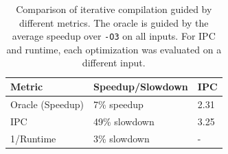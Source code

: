 \begin{table}[t]
\centering
\label{tab:motivation_metrics}
\begin{tabular}{|l|l|l|}
\hline
\textbf{Metric} & \textbf{Speedup/Slowdown} & \textbf{IPC} \\ \hline
\rowcolor{Gray} Oracle (Speedup)             & 7\% speedup                                 & 2.31                      \\ \hline
IPC                          & 49\% slowdown                                & 3.25                      \\ \hline
\rowcolor{Gray}1/Runtime                    & 3\% slowdown                                  & {-}   \\ \hline
\end{tabular}
\caption{Comparison of iterative compilation guided by different metrics.
The oracle is guided by the average speedup over \texttt{-O3} on all inputs.
For IPC and runtime, each optimization was evaluated on a different input.
}
\end{table}





